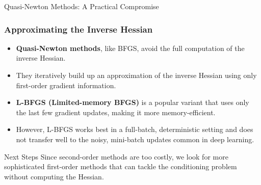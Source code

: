 \begin{frame}{Quasi-Newton Methods: A Practical Compromise}
    \frametitle{Approximating the Inverse Hessian}
    \begin{itemize}
        \item \textbf{Quasi-Newton methods}, like BFGS, avoid the full computation of the inverse Hessian.
        \item They iteratively build up an approximation of the inverse Hessian using only first-order gradient information.
        \item \textbf{L-BFGS (Limited-memory BFGS)} is a popular variant that uses only the last few gradient updates, making it more memory-efficient.
        \item However, L-BFGS works best in a full-batch, deterministic setting and does not transfer well to the noisy, mini-batch updates common in deep learning.
    \end{itemize}
    \begin{alertblock}{Next Steps}
        Since second-order methods are too costly, we look for more sophisticated first-order methods that can tackle the conditioning problem without computing the Hessian.
    \end{alertblock}
\end{frame}

